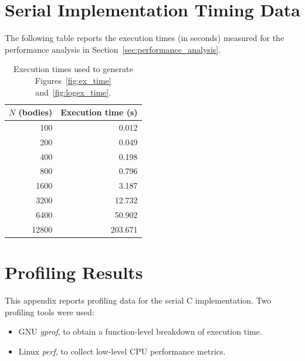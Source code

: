 \documentclass{article}
\begin{document}
\section{Serial Implementation Timing Data}
\label{appendix:serial_times}
The following table reports the execution times (in seconds) measured for the performance analysis in Section~\ref{sec:performance_analysis}.

\begin{table}[H]
    \centering
    \begin{tabular}{r r}
        \toprule
        \textbf{$N$ (bodies)} & \textbf{Execution time (s)} \\
        \midrule
        100 & 0.012 \\
        200 & 0.049 \\
        400 & 0.198 \\
        800 & 0.796 \\
        1600 & 3.187 \\
        3200 & 12.732 \\
        6400 & 50.902 \\
        12800 & 203.671 \\
        \bottomrule
    \end{tabular}
    \caption{Execution times used to generate Figures~\ref{fig:ex_time} and~\ref{fig:logex_time}.}
    \label{tab:serial_times}
\end{table}

\section{Profiling Results}
\label{appendix:profiling_results}
This appendix reports profiling data for the serial C implementation.
Two profiling tools were used:
\begin{itemize}
    \item GNU \emph{gprof}, to obtain a function-level breakdown of execution time.
    \item Linux \emph{perf}, to collect low-level CPU performance metrics.
\end{itemize}
\end{document}
